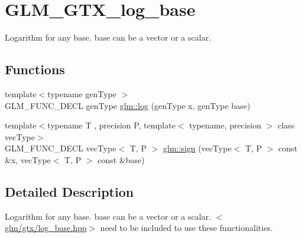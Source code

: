 \hypertarget{group__gtx__log__base}{\section{G\-L\-M\-\_\-\-G\-T\-X\-\_\-log\-\_\-base}
\label{group__gtx__log__base}
}


Logarithm for any base. base can be a vector or a scalar.  


\subsection*{Functions}
\begin{DoxyCompactItemize}
\item 
{\footnotesize template$<$typename gen\-Type $>$ }\\G\-L\-M\-\_\-\-F\-U\-N\-C\-\_\-\-D\-E\-C\-L gen\-Type \hyperlink{group__gtx__log__base_ga3e5bcabee78a977e3d7d1bf352b9ea9f}{glm\-::log} (gen\-Type x, gen\-Type base)
\item 
{\footnotesize template$<$typename T , precision P, template$<$ typename, precision $>$ class vec\-Type$>$ }\\G\-L\-M\-\_\-\-F\-U\-N\-C\-\_\-\-D\-E\-C\-L vec\-Type$<$ T, P $>$ \hyperlink{group__gtx__log__base_ga1842004a127a9f3573764362ff639191}{glm\-::sign} (vec\-Type$<$ T, P $>$ const \&x, vec\-Type$<$ T, P $>$ const \&base)
\end{DoxyCompactItemize}


\subsection{Detailed Description}
Logarithm for any base. base can be a vector or a scalar. $<$\hyperlink{log__base_8hpp}{glm/gtx/log\-\_\-base.\-hpp}$>$ need to be included to use these functionalities. 

